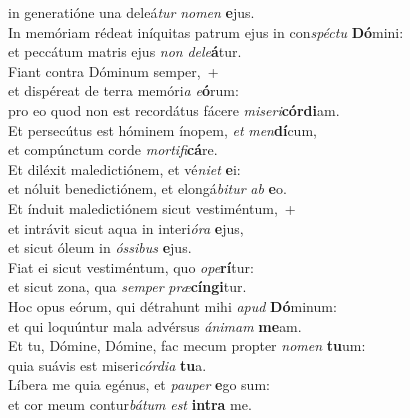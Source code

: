 \evenverse in generatióne una deleá\textit{tur} \textit{no}\textit{men} \textbf{e}jus.\\
\oddverse In memóriam rédeat iníquitas patrum ejus in con\textit{spé}\textit{ctu} \textbf{Dó}mini:~\*\\
\oddverse et peccátum matris ejus \textit{non} \textit{de}\textit{le}\textbf{á}tur.\\
\evenverse Fiant contra Dóminum semper,~+\\
\evenverse  et dispéreat de terra memóri\textit{a} \textit{e}\textbf{ó}rum:~\*\\
\evenverse pro eo quod non est recordátus fácere \textit{mi}\textit{se}\textit{ri}\textbf{cór}\textbf{di}am.\\
\oddverse Et persecútus est hóminem ínopem, \textit{et} \textit{men}\textbf{dí}cum,~\*\\
\oddverse et compúnctum corde \textit{mor}\textit{ti}\textit{fi}\textbf{cá}re.\\
\evenverse Et diléxit maledictiónem, et vé\textit{ni}\textit{et} \textbf{e}i:~\*\\
\evenverse et nóluit benedictiónem, et elongá\textit{bi}\textit{tur} \textit{ab} \textbf{e}o.\\
\oddverse Et índuit maledictiónem sicut vestiméntum,~+\\
\oddverse  et intrávit sicut aqua in interi\textit{ó}\textit{ra} \textbf{e}jus,~\*\\
\oddverse et sicut óleum in \textit{ós}\textit{si}\textit{bus} \textbf{e}jus.\\
\evenverse Fiat ei sicut vestiméntum, quo \textit{o}\textit{pe}\textbf{rí}tur:~\*\\
\evenverse et sicut zona, qua \textit{sem}\textit{per} \textit{præ}\textbf{cín}\textbf{gi}tur.\\
\oddverse Hoc opus eórum, qui détrahunt mihi \textit{a}\textit{pud} \textbf{Dó}minum:~\*\\
\oddverse et qui loquúntur mala advérsus \textit{á}\textit{ni}\textit{mam} \textbf{me}am.\\
\evenverse Et tu, Dómine, Dómine, fac mecum propter \textit{no}\textit{men} \textbf{tu}um:~\*\\
\evenverse quia suávis est miseri\textit{cór}\textit{di}\textit{a} \textbf{tu}a.\\
\oddverse Líbera me quia egénus, et \textit{pau}\textit{per} \textbf{e}go sum:~\*\\
\oddverse et cor meum contur\textit{bá}\textit{tum} \textit{est} \textbf{in}\textbf{tra} me.\\
